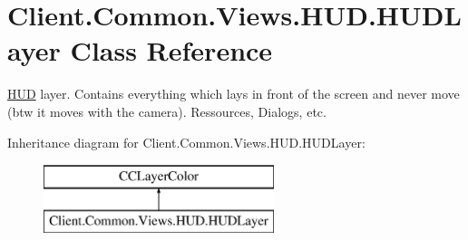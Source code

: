 \hypertarget{classClient_1_1Common_1_1Views_1_1HUD_1_1HUDLayer}{}\section{Client.\+Common.\+Views.\+H\+U\+D.\+H\+U\+D\+Layer Class Reference}
\label{classClient_1_1Common_1_1Views_1_1HUD_1_1HUDLayer}


\hyperlink{namespaceClient_1_1Common_1_1Views_1_1HUD}{H\+U\+D} layer. Contains everything which lays in front of the screen and never move (btw it moves with the camera). Ressources, Dialogs, etc.  


Inheritance diagram for Client.\+Common.\+Views.\+H\+U\+D.\+H\+U\+D\+Layer\+:\begin{figure}[H]
\begin{center}
\leavevmode
\includegraphics[height=2.000000cm]{classClient_1_1Common_1_1Views_1_1HUD_1_1HUDLayer}
\end{center}
\end{figure}
